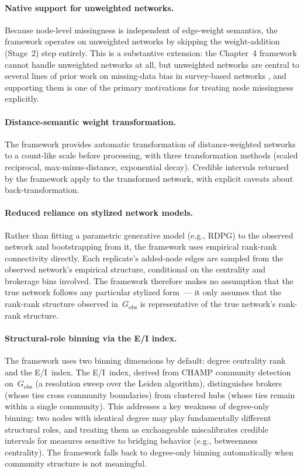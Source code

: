 \documentclass[11pt]{article}
\newcommand{\Gobs}{G_{\text{obs}}}
\begin{document}
\paragraph{Native support for unweighted networks.} Because node-level missingness is independent of edge-weight semantics, the framework operates on unweighted networks by skipping the weight-addition (Stage~2) step entirely. This is a substantive extension: the Chapter~4 framework cannot handle unweighted networks at all, but unweighted networks are central to several lines of prior work on missing-data bias in survey-based networks \citep[e.g.,][of which the present author was a co-author]{SmithMorganMoody2022}, and supporting them is one of the primary motivations for treating node missingness explicitly.

\paragraph{Distance-semantic weight transformation.} The framework provides automatic transformation of distance-weighted networks to a count-like scale before processing, with three transformation methods (scaled reciprocal, max-minus-distance, exponential decay). Credible intervals returned by the framework apply to the transformed network, with explicit caveats about back-transformation.

\paragraph{Reduced reliance on stylized network models.} Rather than fitting a parametric generative model (e.g., RDPG) to the observed network and bootstrapping from it, the framework uses empirical rank-rank connectivity directly. Each replicate's added-node edges are sampled from the observed network's empirical structure, conditional on the centrality and brokerage bins involved. The framework therefore makes no assumption that the true network follows any particular stylized form~--- it only assumes that the rank-rank structure observed in~$\Gobs$ is representative of the true network's rank-rank structure.

\paragraph{Structural-role binning via the E/I index.} The framework uses two binning dimensions by default: degree centrality rank and the E/I~index. The E/I~index, derived from CHAMP community detection on~$\Gobs$ (a resolution sweep over the Leiden algorithm), distinguishes brokers (whose ties cross community boundaries) from clustered hubs (whose ties remain within a single community). This addresses a key weakness of degree-only binning: two nodes with identical degree may play fundamentally different structural roles, and treating them as exchangeable miscalibrates credible intervals for measures sensitive to bridging behavior (e.g., betweenness centrality). The framework falls back to degree-only binning automatically when community structure is not meaningful.
\end{document}
